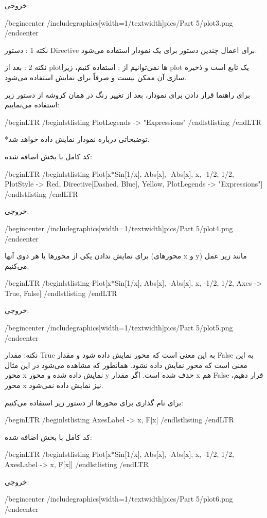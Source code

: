 خروجی:

/begin{center}
/includegraphics[width=1/textwidth]{pics/Part 5/plot3.png}
/end{center}

نکته 1 : دستور Directive برای اعمال چندین دستور برای یک نمودار استفاده می‌شود.

نکته 2 : بعد از plotها نمی‌توانیم از ; استفاده کنیم، زیرا plot یک تابع است و ذخیره سازی آن ممکن نیست و صرفاً برای نمایش استفاده می‌شود.

برای راهنما قرار دادن برای نمودار، بعد از تغییر رنگ در همان کروشه از دستور زیر استفاده می‌نماییم:

/begin{LTR}
/begin{lstlisting}
PlotLegends -> "Expressions"
/end{lstlisting}
/end{LTR}

*توضیحاتی درباره نمودار نمایش داده خواهد شد.

کد کامل با بخش اضافه شده:

/begin{LTR}
/begin{lstlisting}
Plot[{x*Sin[1/x], Abs[x], -Abs[x]}, {x, -1/2, 1/2}, 
 PlotStyle -> { Red, Directive[Dashed, Blue], Yellow}, 
 PlotLegends -> "Expressions"]
/end{lstlisting}
/end{LTR}

خروجی:

/begin{center}
/includegraphics[width=1/textwidth]{pics/Part 5/plot4.png}
/end{center}

برای نمایش ندادن یکی از محور‌ها یا هر دوی آنها (محور‌های x و y) مانند زیر عمل می‌کنیم:

/begin{LTR}
/begin{lstlisting}
Plot[{x*Sin[1/x], Abs[x], -Abs[x]}, {x, -1/2, 1/2}, 
 Axes -> {True, False}]
/end{lstlisting}
/end{LTR}

خروجی:

/begin{center}
/includegraphics[width=1/textwidth]{pics/Part 5/plot5.png}
/end{center}

نکته: مقدار True به این معنی است که محور نمایش داده شود و مقدار False به این معنی است که محور نمایش داده نشود. همانطور که مشاهده می‌شود در این مثال محور x نمایش داده شده و محور y حذف شده است. اگر مقدار x هم False قرار دهیم، محور x نیز نمایش داده نمی‌شود.

برای نام گذاری برای محور‌ها از دستور زیر استفاده می‌کنیم:

/begin{LTR}
/begin{lstlisting}
AxesLabel -> {x, F[x]}
/end{lstlisting}
/end{LTR}

کد کامل با بخش اضافه شده:

/begin{LTR}
/begin{lstlisting}
Plot[{x*Sin[1/x], Abs[x], -Abs[x]}, {x, -1/2, 1/2}, 
 AxesLabel -> {x, F[x]}]
/end{lstlisting}
/end{LTR}

خروجی:

/begin{center}
/includegraphics[width=1/textwidth]{pics/Part 5/plot6.png}
/end{center}

